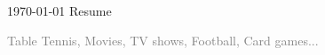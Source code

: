 \documentclass[11pt, a4paper]{awesome-cv}
\begin{document}
\makecvheader[L]

\makecvfooter
  {\today}
  {Resume}
  {\thepage}





\newpage




\textcolor{gray}{ Table Tennis, Movies, TV shows, Football, Card games...}
      



\end{document}
